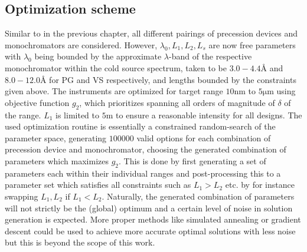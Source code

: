 \documentclass{article}
\newcommand{\targetrange}{$10 \unit{\nano\meter}$ to $5 \unit{\micro\meter}$ }
\begin{document}
\subsection{Optimization scheme}
\label{c5.3}
Similar to in the previous chapter, all different pairings of precession devices and monochromators are considered. However, $\lambda_0, L_1, L_2, L_s$ are now free parameters with $\lambda_0$ being bounded by the approximate $\lambda$-band of the respective monochromator within the cold source spectrum, taken to be $3.0 - 4.4$Å and $8.0 - 12.0$Å for PG and VS respectively, and lengths bounded by the constraints given above. 
The instruments are optimized for target range \targetrange using objective function $g_2$, which prioritizes spanning all orders of magnitude of $\delta$ of the range. $L_1$ is limited to $5 \unit\meter$ to ensure a reasonable intensity for all designs. 
The used optimization routine is essentially a constrained random-search of the parameter space, generating $100000$ valid options for each combination of precession device and monochromator, choosing the generated combination of parameters which maximizes $g_2$. This is done by first generating a set of parameters each within their individual ranges and post-processing this to a parameter set which satisfies all constraints such as $L_1>L_2$ etc. by for instance swapping $L_1, L_2$ if $L_1 < L_2$. Naturally, the generated combination of parameters will not strictly be the (global) optimum and a certain level of noise in solution generation is expected. More proper methods like simulated annealing or gradient descent could be used to achieve more accurate optimal solutions with less noise but this is beyond the scope of this work.


\end{document}
